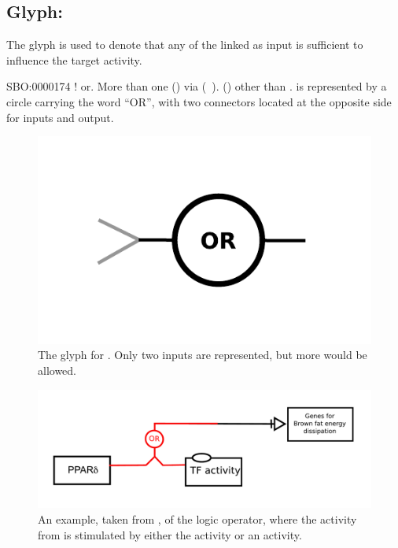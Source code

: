 \subsection{Glyph: }
\label{sec:af:or}

The glyph  is used to denote that any of the  linked as input is sufficient to influence the target activity.

\begin{glyphDescription}
 \glyphSboTerm SBO:0000174 ! or.
 \glyphOrigin More than one  () via  (~).
 \glyphTarget  {} () other than .
 \glyphNode {} is represented by a circle carrying the word ``OR'', with two connectors located at the opposite side for inputs and output.
 \end{glyphDescription}

\begin{figure}[H]
  \centering
  \includegraphics[scale = 0.5]{images/build/or.pdf}
  \caption{The \AF glyph for . Only two inputs are represented, but more would be allowed.}
  \label{fig:af:or}
\end{figure}


\begin{figure}[H]
  \centering
  \includegraphics[scale = 0.5]{images/build/ex-or.pdf}
  \caption{An example, taken from , of the  logic operator, where the activity from  is stimulated by either the  activity or an  activity.}
  \label{fig:af:ex-or}
\end{figure}
